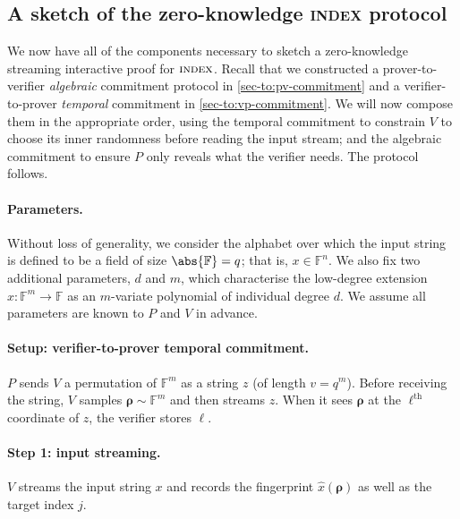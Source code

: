 \documentclass[10pt,a4paper]{article}
\newif\iflipics\lipicsfalse
\theoremstyle{definition}
\newcommand{\field}{\mathbb{F}}
\newcommand{\indexproblem}{\normalfont\textsc{index}\xspace}
\newcommand{\vcommitlength}{v}
\newcommand{\vcommitstring}{z}
\newcommand{\dimension}{m}
\newcommand{\degree}{d}
\newcommand{\fieldsize}{q}
\newcommand{\fingerprinttuple}{\bm{\rho}}
\begin{document}
\subsection{A sketch of the zero-knowledge {\indexproblem} protocol}
\label{sec-to:index-protocol}

    We now have all of the components necessary to sketch a zero-knowledge streaming interactive proof for $\indexproblem$. Recall that we constructed a prover-to-verifier \emph{algebraic} commitment protocol in \cref{sec-to:pv-commitment} and a verifier-to-prover \emph{temporal} commitment in \cref{sec-to:vp-commitment}. We will now compose them in the appropriate order, using the temporal commitment to constrain $V$ to choose its inner randomness before reading the input stream; and the algebraic commitment to ensure $P$ only reveals what the verifier needs.
    The protocol follows.
    
    \paragraph*{Parameters\iflipics\else.\fi}
    Without loss of generality, we consider the alphabet over which the input string is defined to be a field of size $\abs{\field} = \fieldsize$; that is, $x \in \field^n$. We also fix two additional parameters, $\degree$ and $\dimension$, which characterise the low-degree extension $\hat x: \field^\dimension \to \field$ as an $\dimension$-variate polynomial of individual degree $\degree$. We assume all parameters are known to $P$ and $V$ in advance.
    
    \paragraph*{Setup: verifier-to-prover temporal commitment\iflipics\else.\fi} $P$ sends $V$ a permutation of $\field^\dimension$ as a string $\vcommitstring$ (of length $\vcommitlength = \fieldsize^\dimension$). Before receiving the string, $V$ samples $\fingerprinttuple \sim \field^\dimension$ and then streams $\vcommitstring$. When it sees $\fingerprinttuple$ at the $\ell^\text{th}$ coordinate of $z$, the verifier stores $\ell$.

    \paragraph*{Step 1: input streaming\iflipics\else.\fi} $V$ streams the input string $x$ and records the fingerprint $\hat x(\fingerprinttuple)$ as well as the target index $j$.
\end{document}
